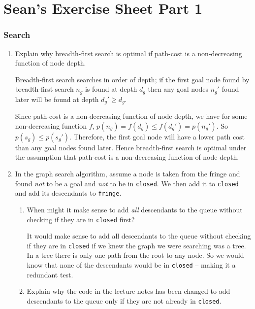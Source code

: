\documentclass[10pt,\jkfside,a4paper]{article}
\begin{document}
\part{Sean's Exercise Sheet Part 1}

\setcounter{section}{2}

\section{Search}

\begin{enumerate}

\item Explain why breadth-first search is optimal if path-cost is a
non-decreasing function of node depth.

Breadth-first search searches in order of depth; if the first
goal node found by breadth-first search $n_g$ is found at depth $d_g$ then
any goal nodes $n_g'$ found later will be found at depth $d_g' \ge d_g$.

Since path-cost is a non-decreasing function of node depth, we have for some
non-decreasing function $f$, $p(n_g) = f(d_g) \le f(d_g') = p(n_g')$. So
$p(s_g) \le p(s_g')$. Therefore, the first goal node will have a lower path
cost than any goal nodes found later. Hence breadth-first search is optimal
under the assumption that path-cost is a non-decreasing function of node
depth.

\item In the graph search algorithm, assume a node is taken from the fringe
and found \textit{not} to be a goal and \textit{not} to be in
\texttt{closed}. We then add it to \texttt{closed} and add its descendants
to \texttt{fringe}.

\begin{enumerate}[label=(\alph*)]

\item When might it make sense to add \textit{all} descendants to the queue
without checking if they are in \texttt{closed} first?

It would make sense to add all descendants to the queue without checking if
they are in \texttt{closed} if we knew the graph we were searching was a
tree. In a tree there is only one path from the root to any node. So we
would know that none of the descendants would be in \texttt{closed} --
making it a redundant test.


\item Explain why the code in the lecture notes has been changed to add
descendants to the queue only if they are not already in \texttt{closed}.


\end{enumerate}
\end{enumerate}
\end{document}

